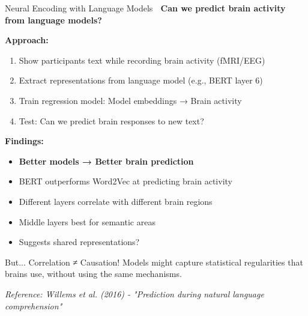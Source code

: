 \documentclass[aspectratio=169]{beamer}
\begin{document}
\begin{frame}[shrink=10]{Neural Encoding with Language Models 🔬}
\textbf{Can we predict brain activity from language models?}

\vspace{1em}

\textbf{Approach:}
\begin{enumerate}\setlength{\itemsep}{0pt}
    \item Show participants text while recording brain activity (fMRI/EEG)
    \item Extract representations from language model (e.g., BERT layer 6)
    \item Train regression model: Model embeddings → Brain activity
    \item Test: Can we predict brain responses to new text?
\end{enumerate}

\vspace{1em}

\textbf{Findings:}
\begin{itemize}\setlength{\itemsep}{0pt}
    \item \textbf{Better models → Better brain prediction}
    \item BERT outperforms Word2Vec at predicting brain activity
    \item Different layers correlate with different brain regions
    \item Middle layers best for semantic areas
    \item Suggests shared representations?
\end{itemize}

\vspace{1em}

\begin{alertblock}{But...}
Correlation ≠ Causation! Models might capture statistical regularities that brains use, without using the same mechanisms.
\end{alertblock}

\small
\textit{Reference: Willems et al. (2016) - "Prediction during natural language comprehension"}
\end{frame}
\end{document}
